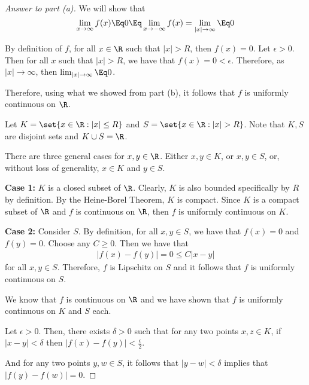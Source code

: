 \documentclass[10pt,twoside]{article}
\begin{document}
\begin{itemize}
\begin{itemize}
\begin{proof}[Answer to part (a)]
        We will show that \[\lim_{x \to \infty} f(x)
        \Eq 0
        \Eq \lim_{x \to -\infty} f(x) = \lim_{|x|\to\infty} \Eq 0\]
        
        By definition of $f$, for all $x\in\R$ such that $|x|>R$, then $f(x) = 0$. Let $\epsilon >0$. Then for all $x$ such that $|x|>R$, we have that $f(x)= 0<\epsilon$. Therefore, as $|x|\to\infty$, then $\lim_{|x|\to\infty} \Eq 0$.\smallskip
        
        Therefore, using what we showed from part (b), it follows that $f$ is uniformly continuous on $\R$.
        
        \iffalse
        Let $K= \set{x\in\R:|x|\leq R}$ and $S = \set{x\in\R:|x|>R}$. Note that $K,S$ are disjoint sets and $K\cup S = \R$.\smallskip
        
        There are three general cases for $x,y\in \R$. Either $x,y\in K$, or $x,y\in S$, or, without loss of generality, $x\in K$ and $y\in S$.\smallskip
        
        
        \textbf{Case 1:} $K$ is a closed subset of $\R$. Clearly, $K$ is also bounded specifically by $R$ by definition. By the Heine-Borel Theorem, $K$ is compact. Since $K$ is a compact subset of $\R$ and $f$ is continuous on $\R$, then $f$ is uniformly continuous on $K$.\smallskip
        
        \textbf{Case 2:} Consider $S$. By definition, for all $x,y\in S$, we have that $f(x) = 0$ and $f(y) = 0$. Choose any $C \geq 0$. Then we have that 
        \begin{gather*}
            |f(x) - f(y)| = 0\leq C|x-y|
        \end{gather*}
        for all $x,y\in S$. Therefore, $f$ is Lipschitz on $S$ and it follows that $f$ is uniformly continuous on $S$. \smallskip
        
        We know that $f$ is continuous on $\R$ and we have shown that $f$ is uniformly continuous on $K$ and $S$ each. 
        
        Let $\epsilon > 0$. Then, there exists $\delta > 0$ such that for any two points $x,z\in K$, if $|x - y|< \delta$ then $|f(x) - f(y)| < \frac{\epsilon}{2}$. 
        
        And for any two points $y,w\in S$, it follows that $|y-w|<\delta$ implies that \newline
        $|f(y) - f(w)| = 0$.
        

\end{proof}
\end{itemize}
\end{itemize}
\end{document}
